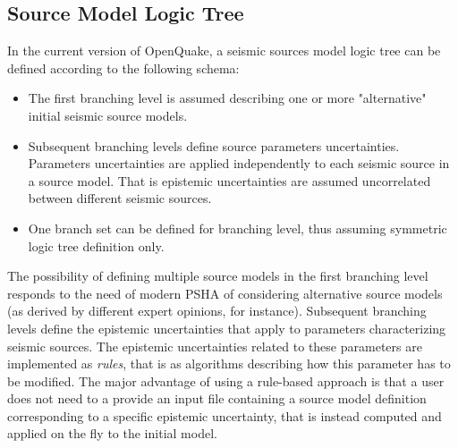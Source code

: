 \subsection{Source Model Logic Tree}
\label{hazard:source_model_logic_tree}
%
In the current version of OpenQuake, a seismic sources model logic tree can be 
defined according to the following schema:
\begin{itemize}
\item The first branching level is assumed describing one or more "alternative" 
initial seismic source models.
\item Subsequent branching levels define source parameters uncertainties. 
Parameters uncertainties are applied independently to each seismic source 
in a source model. That is epistemic uncertainties are assumed uncorrelated 
between different seismic sources.
\item One branch set can be defined for branching level, thus assuming 
symmetric logic tree definition only.
\end{itemize}
%
The possibility of defining multiple source models in the first branching 
level responds to the need of modern PSHA of considering alternative source 
models (as derived by different expert opinions, for instance). 
%
Subsequent branching levels define the epistemic uncertainties that 
apply to parameters characterizing seismic sources. The  
epistemic uncertainties related to these parameters are implemented as 
\emph{rules}, that is as algorithms describing how this parameter has to be 
modified. 
%
The major advantage of using a rule-based approach is that a user does not 
need to a provide an input file containing a source model definition 
corresponding to a specific epistemic uncertainty, that is instead computed 
and applied on the fly to the initial model.
%
